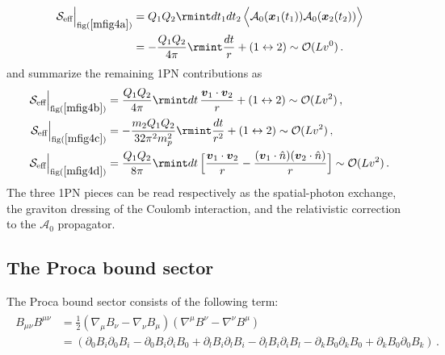 \begin{align}
    \begin{split}
     \mathcal{S}_{\text{eff}}\Big|_{\text{fig}(\ref{mfig4a})}
     &=Q_1Q_2\rmint dt_1 dt_2\,\Big\langle\mathcal{A}_{0}(\boldsymbol{x}_1(t_1))\mathcal{A}_{0}(\boldsymbol{x}_2(t_2))\Big\rangle\\ &
     =-\frac{Q_1Q_2}{4\pi}\rmint \frac{dt}{r}+(1\leftrightarrow 2)\sim \mathcal{O}(Lv^0)\,.
    \end{split}
\end{align}
and summarize the remaining 1PN contributions as
\begin{align}
    \mathcal{S}_{\text{eff}}\Big|_{\text{fig}(\ref{mfig4b})}
    &=\frac{Q_1 Q_2}{4\pi}\rmint dt\, \frac{\boldsymbol{v}_1\cdot \boldsymbol{v}_2}{r}+(1\leftrightarrow 2)\sim \mathcal{O}(Lv^2)\,,\\
    \mathcal{S}_{\text{eff}}\Big|_{\text{fig}(\ref{mfig4c})}
    &=-\frac{m_2Q_1Q_2}{32\pi^2 m_p^2}\rmint \frac{dt}{r^2}+(1\leftrightarrow 2)\sim \mathcal{O}(Lv^2)\,,\\
    \mathcal{S}_{\text{eff}}\Big|_{\text{fig}(\ref{mfig4d})}
    &=\frac{Q_1Q_2}{8\pi}\rmint dt\,\Big[\frac{\boldsymbol{v}_1\cdot \boldsymbol{v}_2}{r}-\frac{(\boldsymbol{v}_1\cdot \Hat{n})(\boldsymbol{v}_2\cdot \Hat{n})}{r}\Big]\sim \mathcal{O}(Lv^2)\,.
\end{align}
The three 1PN pieces can be read respectively as the spatial-photon exchange, the graviton dressing of the Coulomb interaction, and the relativistic correction to the $\mathcal{A}_0$ propagator.
\subsection{The Proca  bound sector}
The Proca bound sector consists of the following term:
\begin{align}
    \begin{split}
  B_{\mu\nu}B^{\mu\nu}&=\frac{1}{2}(\nabla_\mu B_\nu-\nabla_\nu B_\mu)(\nabla^\mu B^\nu-\nabla^\nu B^\mu)\\ &
=(\partial_0B_i\partial_0B_i-\partial_0B_i\partial_iB_0+\partial_lB_i\partial_lB_i-\partial_lB_i\partial_iB_l-\partial_kB_0\partial_kB_0+\partial_kB_0\partial_0B_k)\,.
      \end{split}
\end{align}

